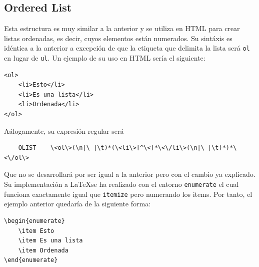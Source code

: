 \documentclass[12pt]{article}
\begin{document}
\subsection{Ordered List}
Esta estructura es muy similar a la anterior y se utiliza en HTML para crear listas ordenadas, es decir, cuyos elementos están numerados. Su sintáxis es idéntica a la anterior a excepción de que la etiqueta que delimita la lista será \verb|ol| en lugar de \verb|ul|. Un ejemplo de su uso en HTML sería el siguiente:
\begin{verbatim}
<ol>
    <li>Esto</li>
    <li>Es una lista</li>
    <li>Ordenada</li>
</ol>
\end{verbatim}
Aálogamente, su expresión regular será 
\begin{verbatim}
    OLIST    \<ol\>(\n|\ |\t)*(\<li\>[^\<]*\<\/li\>(\n|\ |\t)*)*\<\/ol\>
\end{verbatim}
Que no se desarrollará por ser igual a la anterior pero con el cambio ya explicado. Su implementación a \LaTeX se ha realizado con el entorno \verb|enumerate| el cual funciona exactamente igual que \verb|itemize| pero numerando los items. Por tanto, el ejemplo anterior quedaría de la siguiente forma:
\begin{verbatim}
\begin{enumerate}
    \item Esto
    \item Es una lista
    \item Ordenada
\end{enumerate}
\end{verbatim}
\end{document}
